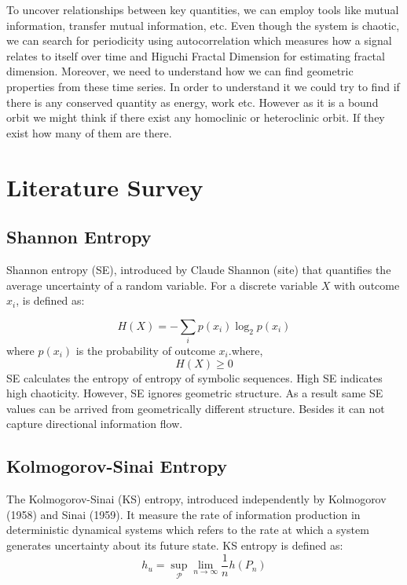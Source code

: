 \documentclass[%
 reprint,
 amsmath,amssymb,
 aps,
 floatfix,
]{revtex4-2}
\begin{document}
To uncover relationships between key quantities, we can employ tools like mutual information, transfer mutual information, etc. Even though the system is chaotic, we can search for periodicity using autocorrelation which measures how a signal relates to itself over time and Higuchi Fractal Dimension for estimating fractal dimension.  Moreover, we need to understand how we can find geometric properties from these time series.
In order to understand it we could try to find if there is any conserved quantity as energy, work etc. However as it is a bound orbit we might think if there exist any homoclinic or heteroclinic orbit. If they exist how many of them are there. 
\section{Literature Survey}
\subsection{Shannon Entropy}
Shannon entropy (SE), introduced by Claude Shannon (site) that quantifies the average uncertainty of a random variable. For a discrete variable $X$ with outcome ${x_i}$, is defined as:

\begin{equation}
H(X) = -\sum_{i} p(x_i) \log_2 p(x_i)
\label{eq:shannon}
\end{equation}
where $p(x_i)$ is the probability of outcome $x_i$.where,
\[
H(X) \geq 0
\]
SE calculates the entropy of entropy of symbolic sequences. High SE indicates high chaoticity. However, SE ignores geometric structure. As a result same SE values can be arrived from geometrically different  structure. Besides it can not capture directional information flow.\\
\subsection{Kolmogorov-Sinai Entropy}
The Kolmogorov-Sinai (KS) entropy, introduced independently by Kolmogorov (1958) and Sinai (1959). It measure the rate of information production in deterministic dynamical systems which refers to the rate at which a system generates uncertainty about its future state. KS entropy is defined as:
\begin{equation}
	h_u  = \operatorname*{sup}_{\mathcal{P}} \operatorname*{\lim}_{n \to \infty} \frac{1}{n} h(P_n)	
\end{equation}
\end{document}
